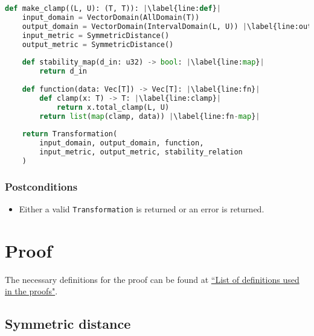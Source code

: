 \documentclass{article}
\begin{document}
\begin{lstlisting}[language=Python, escapechar=|] 
def make_clamp((L, U): (T, T)): |\label{line:def}|
    input_domain = VectorDomain(AllDomain(T))
    output_domain = VectorDomain(IntervalDomain(L, U)) |\label{line:output}|
    input_metric = SymmetricDistance()
    output_metric = SymmetricDistance()
    
    def stability_map(d_in: u32) -> bool: |\label{line:map}|
        return d_in
    
    def function(data: Vec[T]) -> Vec[T]: |\label{line:fn}|
        def clamp(x: T) -> T: |\label{line:clamp}|
            return x.total_clamp(L, U)
        return list(map(clamp, data)) |\label{line:fn-map}|
    
    return Transformation(
        input_domain, output_domain, function, 
        input_metric, output_metric, stability_relation
    )
\end{lstlisting}

\subsubsection*{Postconditions}
\begin{itemize}
    \item Either a valid \texttt{Transformation} is returned or an error is returned.
\end{itemize}

\section{Proof}
The necessary definitions for the proof can be found at \href{https://www.overleaf.com/project/60d214e390b337703d200982}{``List of definitions used in the proofs"}.

\subsection{Symmetric distance}
\end{document}
